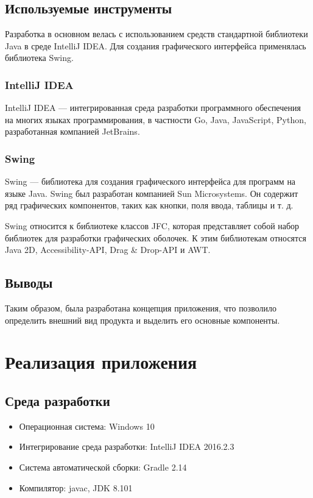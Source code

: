 \subsection{Используемые инструменты}

Разработка в основном велась с использованием средств стандартной библиотеки Java в среде IntelliJ IDEA. Для создания графического интерфейса применялась библиотека Swing. 

\subsubsection{IntelliJ IDEA}

IntelliJ IDEA — интегрированная среда разработки программного обеспечения на многих языках программирования, в частности Go, Java, JavaScript, Python, разработанная компанией JetBrains.

\subsubsection{Swing}

Swing — библиотека для создания графического интерфейса для программ на языке Java. Swing был разработан компанией Sun Microsystems. Он содержит ряд графических компонентов, таких как кнопки, поля ввода, таблицы и т. д.

Swing относится к библиотеке классов JFC, которая представляет собой набор библиотек для разработки графических оболочек. К этим библиотекам относятся Java 2D, Accessibility-API, Drag \& Drop-API и AWT.

\subsection{Выводы}
Таким образом, была разработана концепция приложения, что позволило определить внешний вид продукта и выделить его основные компоненты.

\section{Реализация приложения}

\subsection{Среда разработки}

\begin{itemize}
\item Операционная система: Windows 10
\item Интегрирование среда разработки: IntelliJ IDEA 2016.2.3
\item Система автоматической сборки: Gradle 2.14
\item Компилятор: javac, JDK 8.101
\end{itemize}

